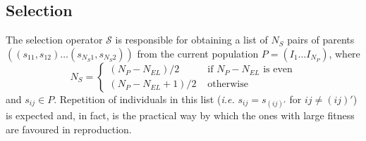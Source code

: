 \documentclass[10pt,a4paper]{report}
\numberwithin{equation}{section}
\begin{document}





\subsection{Selection}
\label{sec:ga-selection}

The selection operator $\mathcal{S}$ is responsible for obtaining a list of $N_S$ pairs of parents
$((s_{11},s_{12})\ldots (s_{N_S 1},s_{N_S 2}))$ from the current population $P=(I_1\ldots I_{N_P})$, where
\begin{equation}
  \label{eq:ga-selection-number}
  N_S = \left\{
    \begin{array}{rl}
      (N_P-N_{EL})/2 & \text{ if } N_P - N_{EL}\text{ is even} \\
      (N_P-N_{EL}+1)/2 & \text{ otherwise }
    \end{array}
  \right.
\end{equation}
and $s_{ij} \in P$.  Repetition of individuals in this list (\textit{i.e.}
$s_{ij} = s_{(ij)'}$ for $ij \neq (ij)'$) is expected and, in fact, is the
practical way by which the ones with large fitness are favoured in reproduction.
\end{document}
